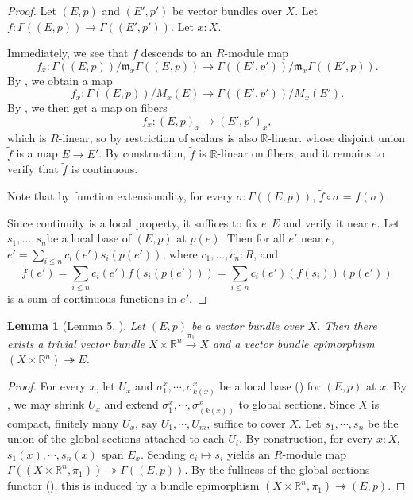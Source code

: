 \documentclass[11pt]{article}
\newcommand{\R}{\mathbb{R}}
\theoremstyle{plain}
\newtheorem{lemma}{Lemma}[section]
\theoremstyle{definition}
\begin{document}
\begin{proof}
  Let \((E,p)\) and \((E',p')\) be vector bundles over \(X\). Let \(f : \Gamma((E,p)) \to \Gamma((E',p'))\). Let \(x : X\).

  Immediately, we see that \(f\) descends to an \(R\)-module map \[f_x : \Gamma((E,p))/\mathfrak{m}_x \Gamma((E,p)) \to \Gamma((E',p'))/\mathfrak{m}_x \Gamma((E',p)).\]
  By , we obtain a map
  \[
f_x : \Gamma((E,p))/M_x(E) \to \Gamma((E',p'))/M_x(E').
\]
By , we then get a map on fibers
\[
f_x : (E,p)_x \to (E',p')_x,
\]
which is \(R\)-linear, so by restriction of scalars is also \(\R\)-linear.
whose disjoint union \(\widetilde{f}\) is a map \(E \to E'\). By construction, \(\widetilde{f}\) is \(\R\)-linear on fibers, and it remains to verify that \(\widetilde{f}\) is continuous.

Note that by function extensionality, for every \(\sigma : \Gamma((E,p))\), \(\widetilde{f} \circ \sigma\) = \(f (\sigma)\).

Since continuity is a local property, it suffices to fix \(e : E\) and verify it near \(e\). Let \(s_1, \dots, s_n\)be a local base of \((E,p)\) at \(p(e)\). Then for all \(e'\) near \(e\), \(e' = \sum_{i \leq n} c_i(e') s_i(p(e'))\), where \(c_1, \dots, c_n : R\), and
\[
  \widetilde{f}(e') = \sum_{i \leq n} c_i(e') \widetilde{f}(s_i(p(e'))) = \sum_{i \leq n} c_i(e') (f(s_i))(p(e'))
\]
is a sum of continuous functions in \(e'\).
\end{proof}

\begin{lemma}[Lemma 5, \cite{swan1962vector}]\label{lemma:free-resolution}
  Let \((E,p)\) be a vector bundle over \(X\). Then there exists a trivial vector bundle \(X \times \R^n \overset{\pi_1}{\to} X\) and a vector bundle epimorphism \((X \times \R^n) \twoheadrightarrow E\).
\end{lemma}

\begin{proof}
  For every \(x\), let \(U_x\) and \(\sigma^x_1, \cdots, \sigma^x_{k(x)}\) be a local base () for \((E,p)\) at \(x\). By , we may shrink \(U_x\) and extend \(\sigma^x_1, \cdots, \sigma^x_{(k(x))}\) to global sections. Since \(X\) is compact, finitely many \(U_x\), say \(U_1, \cdots, U_m\), suffice to cover \(X\). Let \(s_1, \cdots, s_n\) be the union of the global sections attached to each \(U_i\). By construction, for every \(x : X\), \(s_1(x), \cdots, s_n(x)\) span \(E_x\). Sending \(e_i \mapsto s_i\) yields an \(R\)-module map \(\Gamma((X \times \R^n, \pi_1)) \twoheadrightarrow \Gamma((E,p))\). By the fullness of the global sections functor (), this is induced by a bundle epimorphism \((X \times \R^n, \pi_1) \twoheadrightarrow (E,p)\).
\end{proof}
\end{document}

